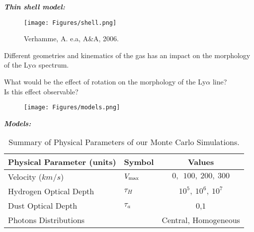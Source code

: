 \documentclass{beamer}
\begin{document}

\begin{frame}{\textit{\textbf{Thin shell model:}}}
\begin{figure}
\texttt{[image: Figures/shell.png]}
\caption*{Verhamme, A. e.a, A\&A, 2006.}
\end{figure}
\end{frame}

\begin{frame}
\LARGE{Different geometries and kinematics of the gas has an impact on the morphology of the
Ly$\alpha$ spectrum.}\\

\end{frame}



\begin{frame}
\LARGE{What would be the effect of rotation on the morphology of the Ly$\alpha$ line?\\ 
Is this effect observable?} 
\end{frame}


\begin{frame}
\begin{figure}
\texttt{[image: Figures/models.png]}
\end{figure}
\end{frame}


\begin{frame}{\textit{\textbf{Models:}}}
\begin{table}
\begin{center}
\begin{tabular}{llc}\hline\hline
Physical Parameter (units) & Symbol & Values\\\hline
Velocity ($km/s$) & $V_{\rm max}$&$0,\ \ 100,\ 200,\ 300$\\
Hydrogen Optical Depth & $\tau_{H} $ & $10^{5},\ 10^{6},\ 10^{7}$\\
Dust Optical Depth & $\tau_{a}$ & $0$,$1$\\
Photons Distributions & & Central, Homogeneous\\\hline\hline
\end{tabular}
\caption{Summary of Physical Parameters of our Monte Carlo Simulations.}
\end{center}
\end{table}
\end{frame}
\end{document}
